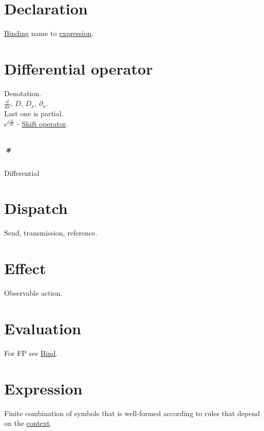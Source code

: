 \documentclass[a4paper,14pt,oneside]{book}
\begin{document}
\chapter{\label{org818234c}Declaration}
\label{sec:orgd35cffc}
\hyperref[org9a498ee]{Binding} name to \hyperref[org3ea9088]{expression}.\\

\chapter{\label{org4e5988a}Differential operator}
\label{sec:orgf0c4581}
Denotation.\\
\(\frac{d}{dx}, \, D, \, D_{x}, \, \partial_{x}.\)\\
Last one is partial.\\

\(e^{t{\frac{d}{dx}}}\) - \hyperref[orgff37215]{Shift operator}.\\

\section{\emph{*}}
\label{sec:org5fe077f}

\label{org1db28b4}Differential\\

\chapter{\label{org0b772c1}Dispatch}
\label{sec:org9e6d960}
Send, transmission, reference.\\

\chapter{\label{org3fe7088}Effect}
\label{sec:orgd455571}
Observable action.\\

\chapter{\label{orgb75d072}Evaluation}
\label{sec:orgad3850a}
For FP see \hyperref[orgd3cebc1]{Bind}.\\

\chapter{\label{org3ea9088}Expression}
\label{sec:org6e604e3}
Finite combination of symbols that is well-formed according to rules that depend on the \hyperref[org71f6df1]{context}.\\
\end{document}
